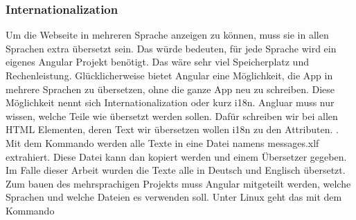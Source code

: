 \subsubsection{Internationalization}
\label{sec:ums-client-i18n}
Um die Webseite in mehreren Sprache anzeigen zu können, muss sie in allen Sprachen extra übersetzt sein. Das würde bedeuten, für jede Sprache wird ein eigenes Angular Projekt benötigt. Das wäre sehr viel Speicherplatz und Rechenleistung. Glücklicherweise bietet Angular eine Möglichkeit, die App in mehrere Sprachen zu übersetzen, ohne die ganze App neu zu schreiben. Diese Möglichkeit nennt sich Internationalization oder kurz i18n. Angluar muss nur wissen, welche Teile wie übersetzt werden sollen. Dafür schreiben wir bei allen \ac{HTML} Elementen, deren Text wir übersetzen wollen i18n zu den Attributen. . Mit dem Kommando  werden alle Texte in eine Datei namens messages.xlf extrahiert. Diese Datei kann dan kopiert werden und einem Übersetzer gegeben. Im Falle dieser Arbeit wurden die Texte alle in Deutsch und Englisch übersetzt. Zum bauen des mehrsprachigen Projekts muss Angular mitgeteilt werden, welche Sprachen und welche Dateien es verwenden soll. Unter Linux geht das mit dem Kommando \\\\

